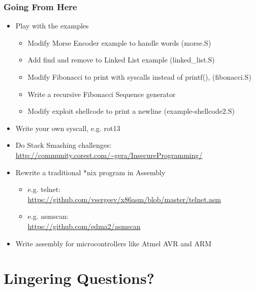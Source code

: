 \documentclass[11pt,xcolor=dvipsnames]{beamer}
\begin{document}
\begin{frame}[fragile,t]
\frametitle{Going From Here}
\begin{itemize}
  \item Play with the examples
  \begin{itemize}
    \item Modify Morse Encoder example to handle words ({\ttfamily morse.S})
    \item Add find and remove to Linked List example ({\ttfamily linked\_list.S})
    \item Modify Fibonacci to print with syscalls instead of {\ttfamily printf()}, ({\ttfamily fibonacci.S})
    \item Write a recursive Fibonacci Sequence generator
    \item Modify exploit shellcode to print a newline ({\ttfamily example-shellcode2.S})
  \end{itemize}
  \item Write your own syscall, e.g. rot13
  \item Do Stack Smashing challenges: \\ {\footnotesize \url{http://community.corest.com/~gera/InsecureProgramming/}}
  \item Rewrite a traditional *nix program in Assembly
\begin{itemize}
  \item e.g. telnet: \\ {\footnotesize \url{https://github.com/vsergeev/x86asm/blob/master/telnet.asm}}
  \item e.g. asmscan: \\ {\footnotesize\url{https://github.com/edma2/asmscan}}
\end{itemize}
  \item Write assembly for microcontrollers like Atmel AVR and ARM
\end{itemize}
\end{frame}

\section*{Lingering Questions?}
\end{document}
